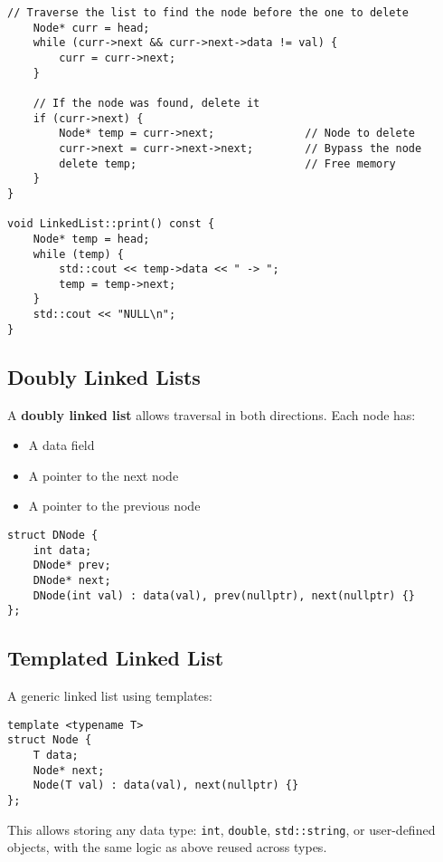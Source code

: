 \documentclass{article}
\begin{document}
\begin{lstlisting}[style=cppstyle]
    // Traverse the list to find the node before the one to delete
    Node* curr = head;
    while (curr->next && curr->next->data != val) {
        curr = curr->next;
    }

    // If the node was found, delete it
    if (curr->next) {
        Node* temp = curr->next;              // Node to delete
        curr->next = curr->next->next;        // Bypass the node
        delete temp;                          // Free memory
    }
}

void LinkedList::print() const {
    Node* temp = head;
    while (temp) {
        std::cout << temp->data << " -> ";
        temp = temp->next;
    }
    std::cout << "NULL\n";
}

\end{lstlisting}

\subsection{Doubly Linked Lists}

A \textbf{doubly linked list} allows traversal in both directions. Each node has:
\begin{itemize}
  \item A data field
  \item A pointer to the next node
  \item A pointer to the previous node
\end{itemize}

\begin{lstlisting}[style=cppstyle]
struct DNode {
    int data;
    DNode* prev;
    DNode* next;
    DNode(int val) : data(val), prev(nullptr), next(nullptr) {}
};
\end{lstlisting}

\subsection{Templated Linked List}

A generic linked list using templates:

\begin{lstlisting}[style=cppstyle]
template <typename T>
struct Node {
    T data;
    Node* next;
    Node(T val) : data(val), next(nullptr) {}
};
\end{lstlisting}

This allows storing any data type: \texttt{int}, \texttt{double}, \texttt{std::string}, or user-defined objects, with the same logic as above reused across types.
\end{document}
